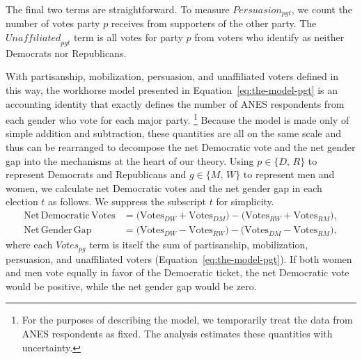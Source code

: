 \documentclass[12pt
               ,final
               ]{article}
\begin{document}
The final two terms are straightforward. To measure $\mathit{Persuasion}_{pgt}$, we count the number of votes party $p$ receives from supporters of the other party. The $\mathit{Unaffiliated}_{pgt}$ term is all votes for party $p$ from voters who identify as neither Democrats nor Republicans.

With partisanship, mobilization, persuasion, and unaffiliated voters defined in this way, the workhorse model presented in Equation~\ref{eq:the-model-pgt} is an accounting identity that exactly defines the number of ANES respondents from each gender who vote for each major party.%
  \footnote{For the purposes of describing the model, we temporarily treat the data from ANES respondents as fixed. The analysis estimates these quantities with uncertainty.} 
Because the model is made only of simple addition and subtraction, these quantities are all on the same scale and thus can be rearranged to decompose the net Democratic vote and the net gender gap into the mechanisms at the heart of our theory. Using $p \in \{D, \, R\}$ to represent Democrats and Republicans and $g \in \{M, \, W\}$ to represent men and women, we calculate net Democratic votes and the net gender gap in each election $t$ as follows. We suppress the subscript $t$ for simplicity.
  \begin{align}
    \label{eq:net-dem-votes} %
    \mathrm{Net \, Democratic \, Votes} 
      &= \big( \mathrm{Votes}_{\mathit{DW}} + 
               \mathrm{Votes}_{\mathit{DM}}
         \big) 
      - \big( \mathrm{Votes}_{\mathit{RW}} +
              \mathrm{Votes}_{\mathit{RM}} 
        \big), \\
    \label{eq:net-gap} %
    \mathrm{Net \, Gender \, Gap}
      &= \big( \mathrm{Votes}_{\mathit{DW}} - 
               \mathrm{Votes}_{\mathit{RW}} 
         \big)
      - \big( \mathrm{Votes}_{\mathit{DM}} - 
              \mathrm{Votes}_{\mathit{RM}} 
        \big),
  \end{align}
%
where each $\mathit{Votes}_{pg}$ term is itself the sum of partisanship, mobilization, persuasion, and unaffiliated voters (Equation~\ref{eq:the-model-pgt}). If both women and men vote equally in favor of the Democratic ticket, the net Democratic vote would be positive, while the net gender gap would be zero.

\end{document}
